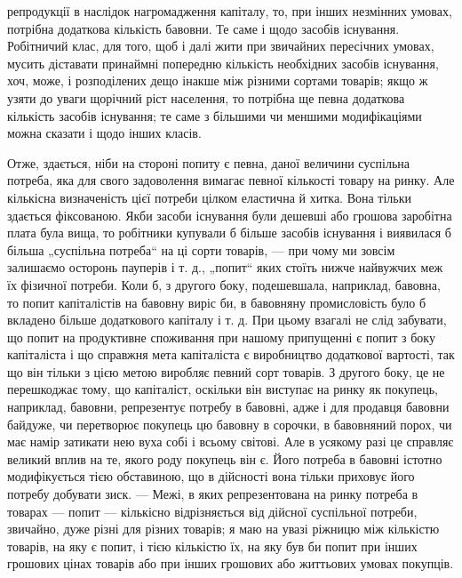 \parcont{}  %
репродукції в наслідок нагромадження капіталу, то, при інших
незмінних умовах, потрібна додаткова кількість бавовни. Те саме
і щодо засобів існування. Робітничий клас, для того, щоб і далі
жити при звичайних пересічних умовах, мусить діставати принаймні
попередню кількість необхідних засобів існування, хоч,
може, і розподілених дещо інакше між різними сортами товарів;
якщо ж узяти до уваги щорічний ріст населення, то потрібна
ще певна додаткова кількість засобів існування; те саме
з більшими чи меншими модифікаціями можна сказати і щодо
інших класів.

Отже, здається, ніби на стороні попиту є певна, даної величини
суспільна потреба, яка для свого задоволення вимагає
певної кількості товару на ринку. Але кількісна визначеність
цієї потреби цілком еластична й хитка. Вона тільки здається
фіксованою. Якби засоби існування були дешевші або грошова
заробітна плата була вища, то робітники купували б більше
засобів існування і виявилася б більша „суспільна потреба“ на
ці сорти товарів, — при чому ми зовсім залишаємо осторонь
пауперів і т. д., „попит“ яких стоїть нижче найвужчих меж їх
фізичної потреби. Коли б, з другого боку, подешевшала, наприклад,
бавовна, то попит капіталістів на бавовну виріс би, в бавовняну
промисловість було б вкладено більше додаткового
капіталу і т. д. При цьому взагалі не слід забувати, що попит
на продуктивне споживання при нашому припущенні є попит
з боку капіталіста і що справжня мета капіталіста є виробництво
додаткової вартості, так що він тільки з цією метою
виробляє певний сорт товарів. З другого боку, це не перешкоджає
тому, що капіталіст, оскільки він виступає на ринку як
покупець, наприклад, бавовни, репрезентує потребу в бавовні,
адже і для продавця бавовни байдуже, чи перетворює покупець
цю бавовну в сорочки, в бавовняний порох, чи має намір
затикати нею вуха собі і всьому світові. Але в усякому разі це
справляє великий вплив на те, якого роду покупець він є. Його
потреба в бавовні істотно модифікується тією обставиною, що
в дійсності вона тільки приховує його потребу добувати зиск. —
Межі, в яких репрезентована на ринку потреба в товарах —
попит — кількісно відрізняється від дійсної суспільної потреби,
звичайно, дуже різні для різних товарів; я маю на увазі ріжницю
між кількістю товарів, на яку є попит, і тією кількістю
їх, на яку був би попит при інших грошових цінах товарів або
при інших грошових або життьових умовах покупців.

